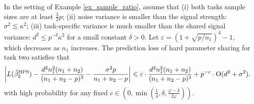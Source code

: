 \begin{corollary}\label{cor_MTL_loss}
	In the setting of Example \ref{ex_sample_ratio}, assume that
	(i) both tasks sample sizes are at least $\frac{3}{2}p$;
	(ii) noise variance is smaller than the signal strength: $\sigma^2 \lesssim  \kappa^2$;
	(iii) task-specific variance is much smaller than the shared signal variance: $d^2 \le p^{-\delta}{\kappa^2}$ for a small constant $\delta>0$.
	Let $\varepsilon = (1 + \sqrt{p/n_1})^ 4 - 1$, which decreases as $n_1$ increases.
	The prediction loss of hard parameter sharing for task two satisfies that
	\begin{align}\label{cor_MTL_error}
	  \left|L(\hat{\beta}_2^{\textup{HPS}}) - \frac{d^2 n_1^2 (n_1 + n_2)}{(n_1 + n_2 - p)^3} -\frac{\sigma^2 p}{n_1 + n_2 - p}  \right| \leqslant \varepsilon \cdot \frac{d^2 n_1^2 (n_1 + n_2)}{(n_1 + n_2 - p)^3} + p^{-c } \cdot \operatorname{O}(d^2 + \sigma^2).
	 \end{align}
	 with high probability for any fixed $c\in(0, \min(\frac{1}{4}, \delta,\frac{\varphi-4}{2\varphi}))$.
	 \end{corollary}

